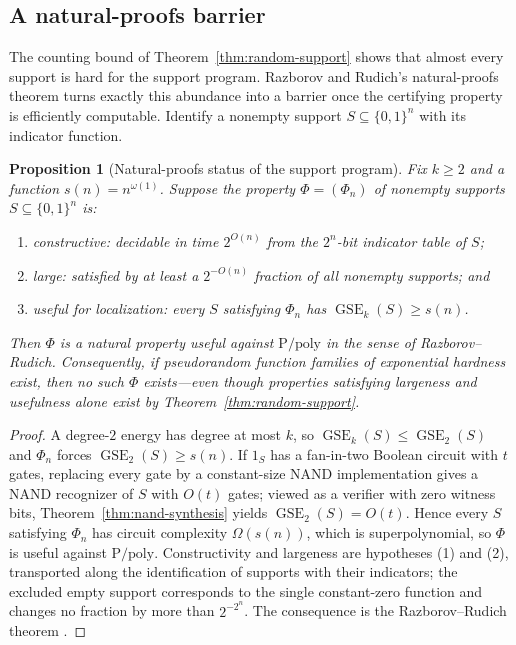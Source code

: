 \documentclass{article}
\newcommand{\GSE}{\operatorname{GSE}}
\newcommand{\bits}{\{0,1\}}
\newtheorem{proposition}{Proposition}
\begin{document}
\subsection{A natural-proofs barrier}
\label{sec:natural-proofs}

The counting bound of Theorem~\ref{thm:random-support} shows that almost
every support is hard for the support program.  Razborov and Rudich's
natural-proofs theorem \cite{razborovrudich97} turns exactly this abundance
into a barrier once the certifying property is efficiently computable.
Identify a nonempty support $S\subseteq\bits^n$ with its indicator function.

\begin{proposition}[Natural-proofs status of the support program]
\label{prop:natural-proofs}
Fix $k\ge2$ and a function $s(n)=n^{\omega(1)}$.  Suppose the property
$\Phi=(\Phi_n)$ of nonempty supports $S\subseteq\bits^n$ is:
\begin{enumerate}
  \item \emph{constructive}: decidable in time $2^{O(n)}$ from the $2^n$-bit
  indicator table of $S$;
  \item \emph{large}: satisfied by at least a $2^{-O(n)}$ fraction of all
  nonempty supports; and
  \item \emph{useful for localization}: every $S$ satisfying $\Phi_n$ has
  $\GSE_k(S)\ge s(n)$.
\end{enumerate}
Then $\Phi$ is a natural property useful against $\mathrm{P/poly}$ in the
sense of Razborov--Rudich.  Consequently, if pseudorandom function families
of exponential hardness exist, then no such $\Phi$ exists---even though
properties satisfying largeness and usefulness alone exist by
Theorem~\ref{thm:random-support}.
\end{proposition}

\begin{proof}
A degree-$2$ energy has degree at most $k$, so
$\GSE_k(S)\le\GSE_2(S)$ and $\Phi_n$ forces $\GSE_2(S)\ge s(n)$.  If $1_S$
has a fan-in-two Boolean circuit with $t$ gates, replacing every gate by a
constant-size NAND implementation gives a NAND recognizer of $S$ with $O(t)$
gates; viewed as a verifier with zero witness bits,
Theorem~\ref{thm:nand-synthesis} yields $\GSE_2(S)=O(t)$.  Hence every $S$
satisfying $\Phi_n$ has circuit complexity $\Omega(s(n))$, which is
superpolynomial, so $\Phi$ is useful against $\mathrm{P/poly}$.
Constructivity and largeness are hypotheses (1) and (2), transported along
the identification of supports with their indicators; the excluded empty
support corresponds to the single constant-zero function and changes no
fraction by more than $2^{-2^n}$.  The consequence is the Razborov--Rudich
theorem \cite{razborovrudich97}.
\end{proof}
\end{document}
